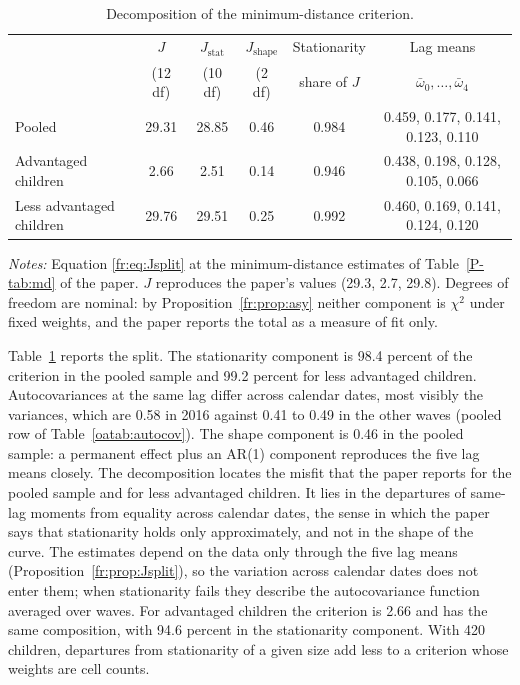 \begin{table}[!htb]
\centering
\small
\setlength{\tabcolsep}{4pt}
\caption{Decomposition of the minimum-distance criterion.}
\label{fr:tab:Jsplit}
\begin{tabular}{@{}lccccc@{}}
\toprule
& $J$ & $J_{\mathrm{stat}}$ & $J_{\mathrm{shape}}$ & Stationarity & Lag means \\
& (12 df) & (10 df) & (2 df) & share of $J$ & $\bar\omega_0,\ldots,\bar\omega_4$ \\
\midrule
Pooled & 29.31 & 28.85 & 0.46 & 0.984 & 0.459, 0.177, 0.141, 0.123, 0.110 \\
Advantaged children & 2.66 & 2.51 & 0.14 & 0.946 & 0.438, 0.198, 0.128, 0.105, 0.066 \\
Less advantaged children & 29.76 & 29.51 & 0.25 & 0.992 & 0.460, 0.169, 0.141, 0.124, 0.120 \\
\bottomrule
\end{tabular}
\par\smallskip
\begin{minipage}{0.95\textwidth}
\footnotesize\emph{Notes:} Equation \eqref{fr:eq:Jsplit} at the
minimum-distance estimates of Table~\ref{P-tab:md} of the paper. $J$
reproduces the paper's values (29.3, 2.7, 29.8). Degrees of freedom are
nominal: by Proposition~\ref{fr:prop:asy} neither component is $\chi^2$
under fixed weights, and the paper reports the total as a measure of fit only.
\end{minipage}
\end{table}

Table~\ref{fr:tab:Jsplit} reports the split. The stationarity component
is 98.4 percent of the criterion in the pooled sample and 99.2 percent for less advantaged children. Autocovariances at the same lag differ across
calendar dates, most visibly the variances, which are 0.58 in 2016 against 0.41 to 0.49 in the other waves (pooled row of
Table~\ref{oatab:autocov}). The shape component is 0.46 in
the pooled sample: a permanent effect plus an AR(1) component reproduces
the five lag means closely. The decomposition locates the
misfit that the paper reports for the pooled sample and for less advantaged children. It lies in the departures of same-lag moments from equality across calendar dates, the sense in which the paper says that stationarity holds only approximately, and not in the shape of the curve. The estimates depend on
the data only through the five lag means
(Proposition~\ref{fr:prop:Jsplit}), so the variation across calendar
dates does not enter them; when stationarity fails they describe the
autocovariance function averaged over waves. For advantaged children the
criterion is 2.66 and has the same composition, with 94.6 percent in the stationarity component. With 420 children, departures from stationarity
of a given size add less to a criterion whose weights are cell counts.

